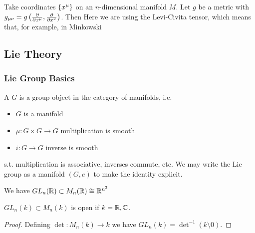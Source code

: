 \documentclass{article}
\begin{document}
\begin{prop}
	Take coordinates $\left\{ x^\mu \right\}$ on an $n$-dimensional manifold $M$. Let $g$ be a metric with $g_{\mu\nu} = g\left( \frac{\partial}{\partial x^\mu}, \frac{\partial}{\partial x^\nu} \right)$. Then  
Here we are using the Levi-Civita tensor, which means that, for example, in Minkowski 
\end{prop}

\subsection{Lie Theory}
\subsubsection{Lie Group Basics}

\begin{definition}
A  $G$ is a group object in the category of manifolds, i.e. 
\begin{itemize}
    \item $G$ is a manifold
    \item $\mu : G \times G \to G$ multiplication is smooth 
    \item $i : G \to G$ inverse is smooth
\end{itemize}
s.t. multiplication is associative, inverses commute, etc. We may write the Lie group as a  manifold $(G,e)$ to make the identity explicit. 
\end{definition}

\begin{example}
We have $GL_n(\mathbb{R})\subset M_n(\mathbb{R}) \cong \mathbb{R}^{n^2}$
\end{example}

\begin{lemma}
	$GL_n(k)\subset M_n(k)$ is open if $k=\mathbb{R},\mathbb{C}$.
\end{lemma}
\begin{proof}
	Defining $\det : M_n(k) \to k$ we have $GL_n(k) = \det^{-1}(k\setminus 0)$.
\end{proof}
\end{document}
